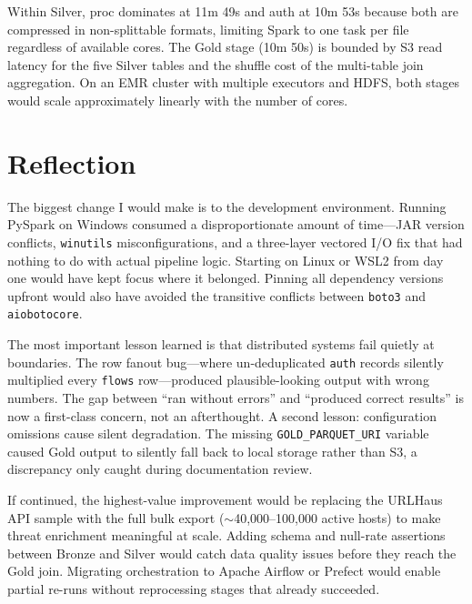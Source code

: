 \documentclass[conference]{IEEEtran}
\begin{document}
Within Silver, proc dominates at 11m 49s and auth at 10m 53s because both are compressed in non-splittable formats, limiting Spark to one task per file regardless of available cores. The Gold stage (10m 50s) is bounded by S3 read latency for the five Silver tables and the shuffle cost of the multi-table join aggregation. On an EMR cluster with multiple executors and HDFS, both stages would scale approximately linearly with the number of cores.

\section{Reflection}
\label{sec:reflection}

The biggest change I would make is to the development environment. Running PySpark on Windows consumed a disproportionate amount of time---JAR version conflicts, \texttt{winutils} misconfigurations, and a three-layer vectored I/O fix that had nothing to do with actual pipeline logic. Starting on Linux or WSL2 from day one would have kept focus where it belonged. Pinning all dependency versions upfront would also have avoided the transitive conflicts between \texttt{boto3} and \texttt{aiobotocore}.

The most important lesson learned is that distributed systems fail quietly at boundaries. The row fanout bug---where un-deduplicated \texttt{auth} records silently multiplied every \texttt{flows} row---produced plausible-looking output with wrong numbers. The gap between ``ran without errors'' and ``produced correct results'' is now a first-class concern, not an afterthought. A second lesson: configuration omissions cause silent degradation. The missing \texttt{GOLD\_PARQUET\_URI} variable caused Gold output to silently fall back to local storage rather than S3, a discrepancy only caught during documentation review.

If continued, the highest-value improvement would be replacing the URLHaus API sample with the full bulk export ($\sim$40,000--100,000 active hosts) to make threat enrichment meaningful at scale. Adding schema and null-rate assertions between Bronze and Silver would catch data quality issues before they reach the Gold join. Migrating orchestration to Apache Airflow or Prefect would enable partial re-runs without reprocessing stages that already succeeded.

\end{document}
